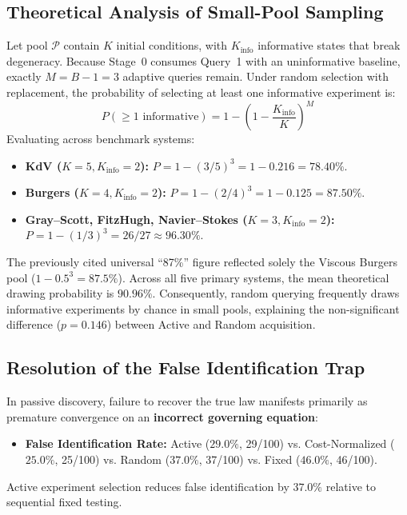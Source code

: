 \documentclass[twocolumn,10pt,a4paper]{article}
\begin{document}
\subsection{Theoretical Analysis of Small-Pool Sampling}
\label{sec:probability}
Let pool $\mathcal{P}$ contain $K$ initial conditions, with $K_{\text{info}}$ informative states that break degeneracy. Because Stage~0 consumes Query~1 with an uninformative baseline, exactly $M = B - 1 = 3$ adaptive queries remain. Under random selection with replacement, the probability of selecting at least one informative experiment is:
\begin{equation}
P(\ge 1 \text{ informative}) = 1 - \left(1 - \frac{K_{\text{info}}}{K}\right)^M
\end{equation}
Evaluating across benchmark systems:
\begin{itemize}
    \item \textbf{KdV ($K=5, K_{\text{info}}=2$):} $P = 1 - (3/5)^3 = 1 - 0.216 = 78.40\%$.
    \item \textbf{Burgers ($K=4, K_{\text{info}}=2$):} $P = 1 - (2/4)^3 = 1 - 0.125 = 87.50\%$.
    \item \textbf{Gray--Scott, FitzHugh, Navier--Stokes ($K=3, K_{\text{info}}=2$):} $P = 1 - (1/3)^3 = 26/27 \approx 96.30\%$.
\end{itemize}
The previously cited universal ``87\%'' figure reflected solely the Viscous Burgers pool ($1 - 0.5^3 = 87.5\%$). Across all five primary systems, the mean theoretical drawing probability is $90.96\%$. Consequently, random querying frequently draws informative experiments by chance in small pools, explaining the non-significant difference ($p=0.146$) between Active and Random acquisition.

\subsection{Resolution of the False Identification Trap}
In passive discovery, failure to recover the true law manifests primarily as premature convergence on an \textbf{incorrect governing equation}:
\begin{itemize}
    \item \textbf{False Identification Rate:} Active ($29.0\%$, 29/100) vs. Cost-Normalized ($25.0\%$, 25/100) vs. Random ($37.0\%$, 37/100) vs. Fixed ($46.0\%$, 46/100).
\end{itemize}
Active experiment selection reduces false identification by $37.0\%$ relative to sequential fixed testing.
\end{document}
